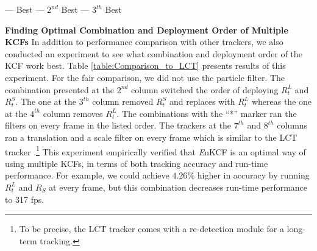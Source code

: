 \documentclass[10pt,twocolumn,letterpaper]{article}
\begin{document}
\begin{table}[!h]
\smaller
\begin{center}
\color{green}--- Best \hspace{.15\linewidth}\color{red}--- $2^{nd}$ Best \hspace{.15\linewidth}\color{blue}--- $3^{th}$ Best \color{black}\\
\end{center}
\caption{Results of running different combinations of the KCFs for
  UAV123 dataset. The '$*$' represents a sequential approach where
  multiple KCFs are, in the given order, applied to every frame like
  in LCT \cite{ma2015long}.}
\label{table:Comparison_to_LCT}
\end{table}

\textbf{Finding Optimal Combination and Deployment Order of Multiple
  KCFs} In addition to performance comparison with other trackers, we
also conducted an experiment to see what combination and deployment
order of the KCF work best. Table \ref{table:Comparison_to_LCT}
presents results of this experiment. For the fair comparison, we did
not use the particle filter. The combination presented at the $2^{nd}$
column switched the order of deploying $R_{t}^{L}$ and
$R_{t}^{S}$. The one at the $3^{th}$ column removed $R_{t}^{S}$ and
replaces with $R_{t}^{L}$ whereas the one at the $4^{th}$ column
removes $R_{t}^{L}$. The combinations with the ``*'' marker ran the
filters on every frame in the listed order. The trackers at the
$7^{th}$ and $8^{th}$ columns ran a translation and a scale filter on
every frame which is similar to the LCT tracker
\cite{ma2015long}.\footnote{To be precise, the LCT tracker comes with
  a re-detection module for a long-term tracking.} This experiment
empirically verified that \textit{E}nKCF is an optimal way of using
multiple KCFs, in terms of both tracking accuracy and run-time
performance. For example, we could achieve $4.26\%$ higher in accuracy
by running $R_{t}^{L}$ and $R_{S}$ at every frame, but this
combination decreases run-time performance to 317 fps. 
\end{document}
